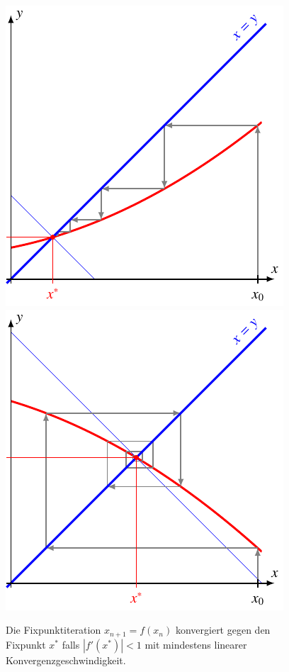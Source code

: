 %
%
%
\begin{figure}
\centering
\includegraphics{chapters/10-arithmetik/figures/normal.pdf}
\includegraphics{chapters/10-arithmetik/figures/negativ.pdf}
\caption{Die Fixpunktiteration $x_{n+1}=f(x_n)$ konvergiert gegen
den Fixpunkt $x^*$ falls $|f'(x^*)|<1$ mit
mindestens linearer Konvergenzgeschwindigkeit.
\label{buch:figure:fixpunkt:normal}}
\end{figure}
%
